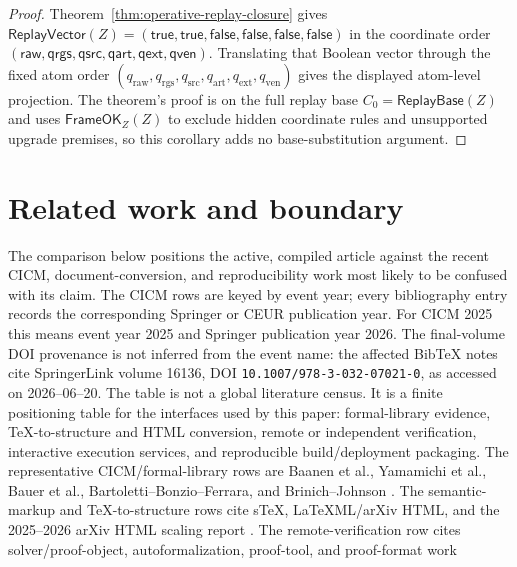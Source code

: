 \documentclass[runningheads]{llncs}
\newcommand{\ReplayVector}{\mathsf{ReplayVector}}
\newcommand{\ReplayBase}{\mathsf{ReplayBase}}
\newcommand{\FrameOKZ}{\mathsf{FrameOK}_{Z}}
\newcommand{\rawBeginTokenCoord}{q_{\mathrm{raw}}}
\newcommand{\qlex}{\rawBeginTokenCoord}
\newcommand{\qrgs}{q_{\mathrm{rgs}}}
\newcommand{\qsrc}{q_{\mathrm{src}}}
\newcommand{\qart}{q_{\mathrm{art}}}
\newcommand{\qext}{q_{\mathrm{ext}}}
\newcommand{\qven}{q_{\mathrm{ven}}}
\begin{document}
\begin{proof}
Theorem~\ref{thm:operative-replay-closure} gives
\(\ReplayVector(Z)=(\mathsf{true},\mathsf{true},\mathsf{false},
\mathsf{false},\mathsf{false},\mathsf{false})\) in the coordinate order
\((\mathsf{raw},\mathsf{qrgs},\mathsf{qsrc},\mathsf{qart},\mathsf{qext},
\mathsf{qven})\).  Translating that Boolean vector through the fixed atom order
\((\qlex,\qrgs,\qsrc,\qart,\qext,\qven)\) gives the displayed atom-level
projection.  The theorem's proof is on the full replay base \(C_0=\ReplayBase(Z)\)
and uses \(\FrameOKZ(Z)\) to exclude hidden coordinate rules and unsupported
upgrade premises, so this corollary adds no base-substitution argument.
\end{proof}

\section{Related work and boundary}
\label{sec:active-related-work}
The comparison below positions the active, compiled article against the recent
CICM, document-conversion, and reproducibility work most likely to be confused
with its claim.  The CICM rows are keyed by event year; every bibliography entry
records the corresponding Springer or CEUR publication year.  For CICM 2025 this
means event year 2025 and Springer publication year 2026.  The final-volume DOI
provenance is not inferred from the event name: the affected BibTeX notes cite
SpringerLink volume 16136, DOI \texttt{10.1007/978-3-032-07021-0}, as accessed
on 2026--06--20.  The table is not a global literature census.  It is a finite
positioning table for the interfaces used by this paper: formal-library evidence,
\TeX{}-to-structure and HTML conversion, remote or independent verification,
interactive execution services, and reproducible build/deployment packaging.
The representative CICM/formal-library rows are Baanen et al., Yamamichi et al.,
Bauer et al., Bartoletti--Bonzio--Ferrara, and Brinich--Johnson
\cite{BaanenEtAl2026GrowingMathlib,YamamichiEtAl2021MizarPlatform,BauerEtAl2024LeanHoG}
\cite{BartolettiBonzioFerrara2026Semigroups,BrinichJohnson2024QFT}.  The
semantic-markup and \TeX{}-to-structure rows cite sTeX, LaTeXML/arXiv HTML, and
the 2025--2026 arXiv HTML scaling report
\cite{KohlhaseMuellerSchaefer2021STeX,FrankstonEtAl2024HTMLPapers,GinevEtAl2026ArXivHTML}.
The remote-verification row cites solver/proof-object, autoformalization,
proof-tool, and proof-format work
\cite{Seidl2023NeverTrustSolver,BrownKaliszykUrban2026Proofgold,HorowitzEtAl2026Herald}
\end{document}
